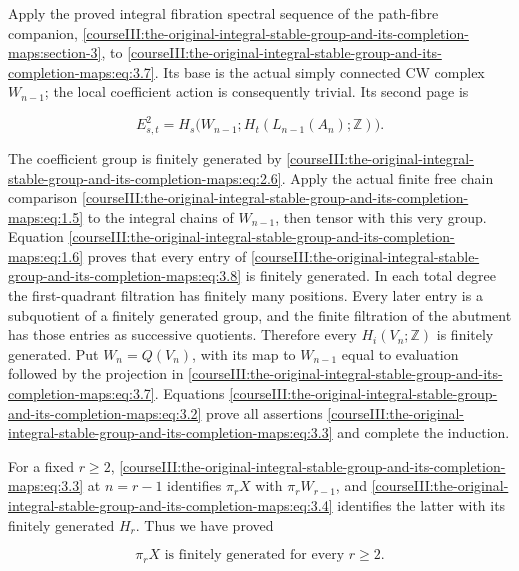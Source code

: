 Apply the proved integral fibration spectral sequence of the path-fibre companion, \cref{courseIII:the-original-integral-stable-group-and-its-completion-maps:section-3}, to \eqref{courseIII:the-original-integral-stable-group-and-its-completion-maps:eq:3.7}. Its base is the actual simply connected CW complex \(W_{n-1}\); the local coefficient action is consequently trivial. Its second page is

\begin{equation}
E^2_{s,t}=H_s\bigl(W_{n-1};H_t(L_{n-1}(A_n);\mathbb Z)\bigr).
 \label{courseIII:the-original-integral-stable-group-and-its-completion-maps:eq:3.8}
\end{equation}

The coefficient group is finitely generated by \eqref{courseIII:the-original-integral-stable-group-and-its-completion-maps:eq:2.6}. Apply the actual finite free chain comparison \eqref{courseIII:the-original-integral-stable-group-and-its-completion-maps:eq:1.5} to the integral chains of \(W_{n-1}\), then tensor with this very group. Equation \eqref{courseIII:the-original-integral-stable-group-and-its-completion-maps:eq:1.6} proves that every entry of \eqref{courseIII:the-original-integral-stable-group-and-its-completion-maps:eq:3.8} is finitely generated. In each total degree the first-quadrant filtration has finitely many positions. Every later entry is a subquotient of a finitely generated group, and the finite filtration of the abutment has those entries as successive quotients. Therefore every \(H_i(V_n;\mathbb Z)\) is finitely generated. Put \(W_n=Q(V_n)\), with its map to \(W_{n-1}\) equal to evaluation followed by the projection in \eqref{courseIII:the-original-integral-stable-group-and-its-completion-maps:eq:3.7}. Equations \eqref{courseIII:the-original-integral-stable-group-and-its-completion-maps:eq:3.2} prove all assertions \eqref{courseIII:the-original-integral-stable-group-and-its-completion-maps:eq:3.3} and complete the induction.

For a fixed \(r\geq2\), \eqref{courseIII:the-original-integral-stable-group-and-its-completion-maps:eq:3.3} at \(n=r-1\) identifies \(\pi_rX\) with \(\pi_rW_{r-1}\), and \eqref{courseIII:the-original-integral-stable-group-and-its-completion-maps:eq:3.4} identifies the latter with its finitely generated \(H_r\). Thus we have proved

\begin{equation}
\pi_rX\text{ is finitely generated for every }r\geq2.
 \label{courseIII:the-original-integral-stable-group-and-its-completion-maps:eq:3.9}
\end{equation}

